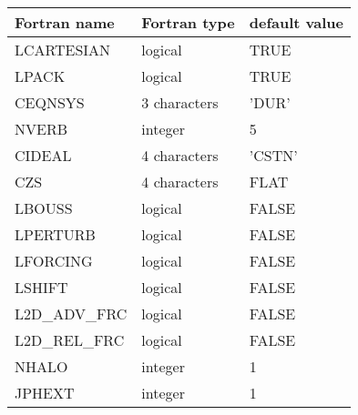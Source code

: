 \begin{center}
\begin{tabular} {|l|l|l|}
\hline
Fortran name & Fortran type & default value \\
\hline
LCARTESIAN & logical     & TRUE  \\
LPACK      & logical     & TRUE  \\
CEQNSYS    & 3 characters& 'DUR'   \\
NVERB      & integer     & 5     \\
CIDEAL     & 4 characters& 'CSTN'  \\
CZS        & 4 characters& FLAT  \\
LBOUSS     & logical     & FALSE \\
LPERTURB   & logical     & FALSE \\
LFORCING   & logical     & FALSE \\
LSHIFT     & logical     & FALSE \\
L2D\_ADV\_FRC  & logical     & FALSE \\
L2D\_REL\_FRC  & logical     & FALSE \\
NHALO      & integer        & 1      \\
JPHEXT     & integer        & 1      \\
\hline
\end{tabular}
\end{center}

